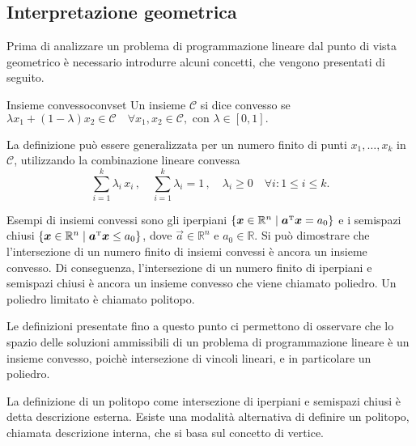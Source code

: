 \subsection{Interpretazione geometrica}
Prima di analizzare un problema di programmazione lineare dal punto di vista geometrico è necessario introdurre alcuni
concetti, che vengono presentati di seguito.

\begin{definition}{Insieme convesso}{convset}
    Un insieme \( \mathcal{C} \) si dice convesso se
    \(
        \lambda x_1 + (1 - \lambda) x_2 \in \mathcal{C} \quad \forall x_1, x_2 \in \mathcal{C}, \text{ con } \lambda
        \in [0, 1].
    \)
\end{definition}
\noindent
La definizione può essere generalizzata per un numero finito di punti \( x_1,\ldots, x_k \) in \( \mathcal{C} \),
utilizzando la combinazione lineare convessa
\begin{equation}
    \sum_{i = 1}^k \lambda_i\, x_i\,, \quad \sum_{i = 1}^k \lambda_i = 1\,, \quad \lambda_i \geq 0 \quad \forall i\colon
    1 \leq i \leq k.
\end{equation}

Esempi di insiemi convessi sono gli iperpiani \( \{\bm{x} \in \mathbb{R}^n \mid \bm{a}^{\scriptscriptstyle\mathrm{T}} \bm{x} = a_0\} \) e i
semispazi chiusi \( \{\bm{x} \in \mathbb{R}^n \mid \bm{a}^{\scriptscriptstyle\mathrm{T}} \bm{x} \leq a_0\} \), dove \( \vec{a} \in \mathbb{R}^n
\) e \( a_0 \in \mathbb{R} \). Si può dimostrare che l'intersezione di un numero finito di insiemi convessi è ancora un
insieme convesso. Di conseguenza, l'intersezione di un numero finito di iperpiani e semispazi chiusi è ancora un insieme
convesso che viene chiamato poliedro. Un poliedro limitato è chiamato politopo.

Le definizioni presentate fino a questo punto ci permettono di osservare che lo spazio delle soluzioni ammissibili di un
problema di programmazione lineare è un insieme convesso, poichè intersezione di vincoli lineari, e in particolare un
poliedro.

La definizione di un politopo come intersezione di iperpiani e semispazi chiusi è detta descrizione esterna. Esiste una
modalità alternativa di definire un politopo, chiamata descrizione interna, che si basa sul concetto di vertice.

